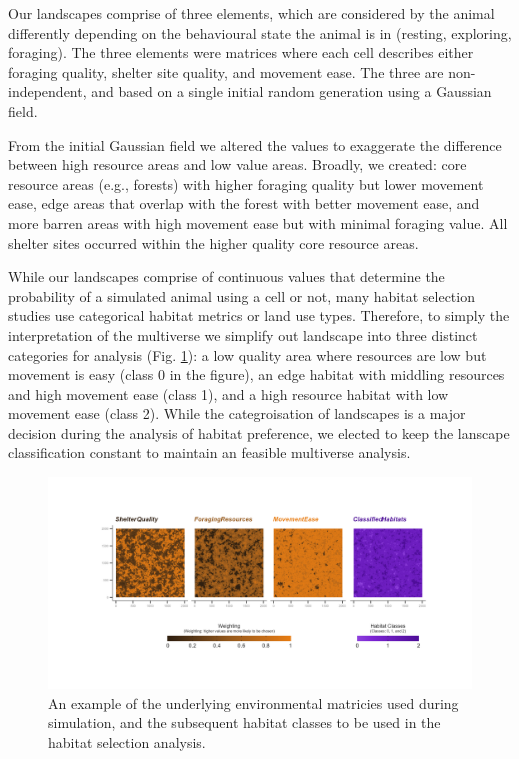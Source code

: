 \documentclass[10pt,a4paper]{article}
\begin{document}
Our landscapes comprise of three elements, which are considered by the animal differently depending on the behavioural state the animal is in (resting, exploring, foraging).
The three elements were matrices where each cell describes either foraging quality, shelter site quality, and movement ease.
The three are non-independent, and based on a single initial random generation using a Gaussian field.

From the initial Gaussian field we altered the values to exaggerate the difference between high resource areas and low value areas.
Broadly, we created: core resource areas (e.g., forests) with higher foraging quality but lower movement ease, edge areas that overlap with the forest with better movement ease, and more barren areas with high movement ease but with minimal foraging value.
All shelter sites occurred within the higher quality core resource areas.

While our landscapes comprise of continuous values that determine the probability of a simulated animal using a cell or not, many habitat selection studies use categorical habitat metrics or land use types.
Therefore, to simply the interpretation of the multiverse we simplify out landscape into three distinct categories for analysis (Fig. \ref{fig:landscapeExample}): a low quality area where resources are low but movement is easy (class 0 in the figure), an edge habitat with middling resources and high movement ease (class 1), and a high resource habitat with low movement ease (class 2).
While the categroisation of landscapes is a major decision during the analysis of habitat preference, we elected to keep the lanscape classification constant to maintain an feasible multiverse analysis.

\begin{figure}
\includegraphics[width=1\linewidth]{../prereg/figures/landscapeExample} \caption{An example of the underlying environmental matricies used during simulation, and the subsequent habitat classes to be used in the habitat selection analysis.}\label{fig:landscapeExample}
\end{figure}
\end{document}
